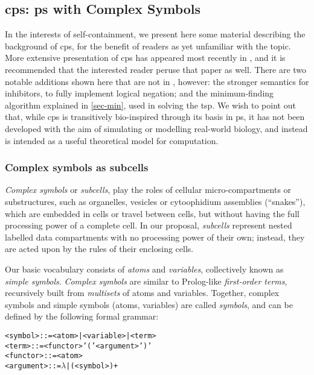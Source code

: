 \subsection{\label{sec:tsp:cpsystems}\texorpdfstring{\gls{cps}}{cP systems}: \texorpdfstring{\gls{ps}}{P systems} with Complex Symbols}

In the interests of self-containment, we present here some material describing the background of \gls{cps}, for the benefit of readers as yet unfamiliar with the topic.  More extensive presentation of \gls{cps} has appeared most recently in \cite{Nicolescu2018}, and it is recommended that the interested reader peruse that paper as well.  There are two notable additions shown here that are not in \cite{Nicolescu2018}, however: the stronger semantics for inhibitors, to fully implement logical negation; and the minimum-finding algorithm explained in \autoref{sec-min}, used in solving the \gls{tsp}.  We wish to point out that, while \gls{cps} is transitively bio-inspired through its basis in \gls{ps}, it has not been developed with the aim of simulating or modelling real-world biology, and instead is intended as a useful theoretical model for computation.

\subsubsection{Complex symbols as subcells}

\emph{Complex symbols} or \emph{subcells}, 
play the roles of cellular micro-compartments or substructures,
such as organelles, vesicles or cytoophidium assemblies (``snakes''),
which are embedded in cells or travel between cells, 
but without having the full processing power of a complete cell.
In our proposal, \emph{subcells} represent nested labelled data compartments
with no processing power of their own;
instead, they are acted upon by the rules of their enclosing cells.

Our basic vocabulary consists of \emph{atoms} and \emph{variables}, 
collectively known as \emph{simple symbols}.
\emph{Complex symbols} are similar to Prolog-like \emph{first-order terms}, 
recursively built from \emph{multisets} of atoms and variables.
Together, complex symbols and simple symbols (atoms, variables) are called \emph{symbols},
and can be defined by the following formal grammar:

\begin{framed}
\vspace{-0.5cm}
\begin{small}
\begin{alltt}
    <symbol> ::= <atom> | <variable> | <term> 
    <term> ::= <functor> '(' <argument> ')'
    <functor> ::= <atom>
    <argument> ::= \(\lambda\) | ( <symbol> )+
\end{alltt}
\end{small}
\vspace{-0.5cm}
\end{framed}

